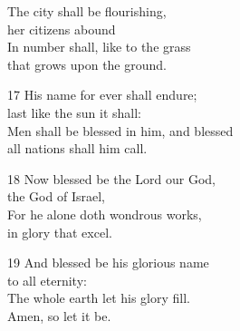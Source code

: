 The city shall be flourishing,\\
her citizens abound\\
In number shall, like to the grass\\
that grows upon the ground.

17 His name for ever shall endure;\\
last like the sun it shall:\\
Men shall be blessed in him, and blessed\\
all nations shall him call.

18 Now blessed be the Lord our God,\\
the God of Israel,\\
For he alone doth wondrous works,\\
in glory that excel.

19 And blessed be his glorious name\\
to all eternity:\\
The whole earth let his glory fill.\\
Amen, so let it be.

\begin{center}
\quad{}\quad{}
\end{center}




